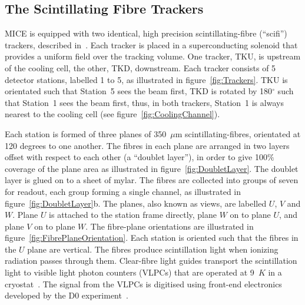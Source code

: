 
  \subsection{The Scintillating Fibre Trackers}
  \label{subsec:Trackers}
  MICE is equipped with two identical, high precision scintillating-fibre (``scifi'') trackers, described in~\cite{TrackersNIM}. Each tracker is placed in a superconducting solenoid that provides a uniform field over the tracking volume. One tracker, TKU, is upstream of the cooling cell, the other, TKD, downstream.  Each tracker consists of 5 detector stations, labelled 1 to 5, as illustrated in figure~\ref{fig:Trackers}. TKU is orientated such that Station~5 sees the beam first, TKD is rotated by 180$^\circ$ such that Station~1 sees the beam first, thus, in both trackers, Station~1 is always nearest to the cooling cell (see figure~\ref{fig:CoolingChannel}).
 

  Each station is formed of three planes of 350~$\mu$m scintillating-fibres, orientated at 120 degrees to one another. The fibres in each plane are arranged in two layers offset with respect to each other (a ``doublet layer''), in order to give 100$\%$ coverage of the plane area as illustrated in figure~\ref{fig:DoubletLayer}. The doublet layer is glued on to a sheet of mylar. The fibres are collected into groups of seven for readout, each group forming a single channel, as illustrated in figure~\ref{fig:DoubletLayer}b. The planes, also known as views, are labelled $U$, $V$ and $W$. Plane $U$ is attached to the station frame directly, plane $W$ on to plane $U$, and plane $V$ on to plane $W$. The fibre-plane orientations are illustrated in figure~\ref{fig:FibrePlaneOrientation}. Each station is oriented such that the fibres in the $U$ plane are vertical. The fibres produce scintillation light when ionizing radiation passes through them. Clear-fibre light guides transport the scintillation light to visible light photon counters (VLPCs) that are operated at 9~$K$ in a cryostat~\cite{TrackersNIM}. The signal from the VLPCs is digitised using front-end electronics developed by the D0 experiment~\cite{D0}. %
  
